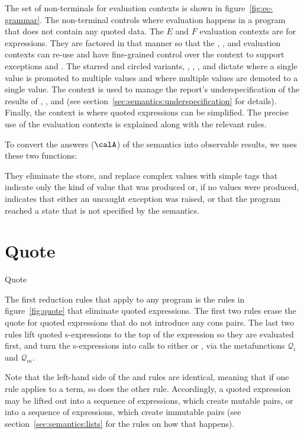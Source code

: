 The set of non-terminals for evaluation contexts is shown in
figure~\ref{fig:ec-grammar}. The  non-terminal controls where
evaluation happens in a program that does not contain any quoted data.
The $E$ and $F$ evaluation contexts are for expressions.  They are factored in
that manner so that the , , and  evaluation contexts can
re-use  and have fine-grained control over the context to support
exceptions and . The starred and circled variants,
\Estar{}, \Eo{}, \Fstar{}, and \Fo{} dictate where a single value is
promoted to multiple values and where multiple values are demoted to a
single value. The  context is used to manage the report's underspecification of the results of , , and  (see section~\ref{sec:semantics:underspecification} for details). Finally, the  context is where quoted expressions can be simplified. The precise use of the evaluation contexts is explained along with the relevant rules.

To convert the answers ($\calA$)  of the semantics into observable results, we uses these two functions:


They eliminate the store, and replace complex values with simple tags that indicate only the kind of value that was produced or, if no values were produced, indicates that either an uncaught exception was raised, or that the program reached a state that is not specified by the semantics.

\section{Quote}\label{sec:semantics:quote}

\beginfig
\begin{center}



\end{center}
\caption{Quote}\label{fig:quote}
\endfig

The first reduction rules that apply to any program is the 
rules in figure~\ref{fig:quote} that eliminate quoted expressions. 
The first two rules erase the quote for quoted expressions that do not introduce any cons pairs.
The last two rules lift quoted s-expressions to the top of the expression so they are evaluated first, and turn the s-expressions into calls to either  or , via the metafunctions $\mathscr{Q}_i$ and $\mathscr{Q}_m$.

Note that the left-hand side of the  and  rules are identical, meaning that if one rule applies to a term, so does the other rule. 
Accordingly, a quoted expression may be lifted out into a sequence of  expressions, which create mutable pairs, or into a sequence of  expressions, which create immutable pairs (see section~\ref{sec:semantics:lists} for the rules on how that happens).


